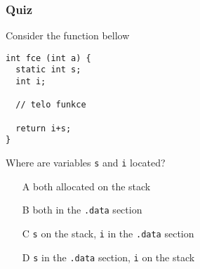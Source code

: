 \documentclass{beamer}
\begin{document}
\begin{frame}[fragile]
\frametitle{Quiz}

Consider the function bellow
\begin{verbatim}
int fce (int a) {
  static int s;
  int i;
  
  // telo funkce
  
  return i+s;
}
\end{verbatim}
Where are variables \texttt{s} and \texttt{i} located?
\begin{itemize}
 \item[A] both allocated on the stack
 \item[B] both in the \texttt{.data} section
 \item[C] \texttt{s} on the stack, \texttt{i} in the \texttt{.data} section
 \item[D] \texttt{s} in the \texttt{.data} section, \texttt{i} on the stack
\end{itemize}
\end{frame}
\end{document}
